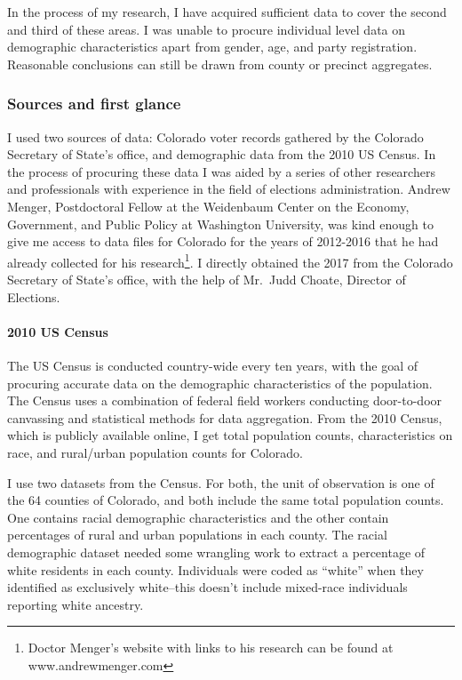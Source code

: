 \documentclass[]{article}
\let\oldparagraph\paragraph
\renewcommand{\paragraph}[1]{\oldparagraph{#1}\mbox{}}
\let\rmarkdownfootnote\footnote%
\def\footnote{\protect\rmarkdownfootnote}
\begin{document}
In the process of my research, I have acquired sufficient data to cover
the second and third of these areas. I was unable to procure individual
level data on demographic characteristics apart from gender, age, and
party registration. Reasonable conclusions can still be drawn from
county or precinct aggregates.

\subsubsection{Sources and first glance}\label{sources-and-first-glance}

I used two sources of data: Colorado voter records gathered by the
Colorado Secretary of State's office, and demographic data from the 2010
US Census. In the process of procuring these data I was aided by a
series of other researchers and professionals with experience in the
field of elections administration. Andrew Menger, Postdoctoral Fellow at
the Weidenbaum Center on the Economy, Government, and Public Policy at
Washington University, was kind enough to give me access to data files
for Colorado for the years of 2012-2016 that he had already collected
for his research\footnote{Doctor Menger's website with links to his
  research can be found at www.andrewmenger.com}. I directly obtained
the 2017 from the Colorado Secretary of State's office, with the help of
Mr.~Judd Choate, Director of Elections.

\paragraph{2010 US Census}\label{us-census}

The US Census is conducted country-wide every ten years, with the goal
of procuring accurate data on the demographic characteristics of the
population. The Census uses a combination of federal field workers
conducting door-to-door canvassing and statistical methods for data
aggregation. From the 2010 Census, which is publicly available online, I
get total population counts, characteristics on race, and rural/urban
population counts for Colorado.

I use two datasets from the Census. For both, the unit of observation is
one of the 64 counties of Colorado, and both include the same total
population counts. One contains racial demographic characteristics and
the other contain percentages of rural and urban populations in each
county. The racial demographic dataset needed some wrangling work to
extract a percentage of white residents in each county. Individuals were
coded as ``white'' when they identified as exclusively white--this
doesn't include mixed-race individuals reporting white ancestry.
\end{document}
